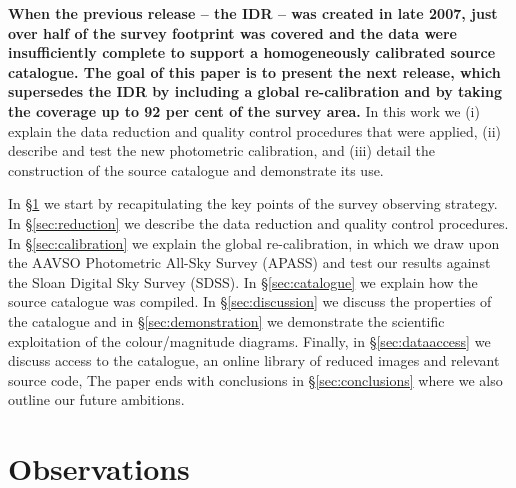 \documentclass[a4paper,useAMS,usenatbib]{mn2e}
\begin{document}
{\bf When the previous release -- the IDR -- was created in late 2007,
just over half of the survey footprint was covered
and the data were insufficiently complete 
to support a homogeneously calibrated source catalogue.
The goal of this paper is to present the next release, 
 which supersedes the IDR by including a global re-calibration
and by taking the coverage up to 92 per cent of the survey area.}
In this work we
(i) explain the data reduction 
and quality control procedures that were applied,
(ii) describe and test the new photometric calibration, and 
(iii) detail the construction of the source catalogue
and demonstrate its use.

In \S\ref{sec:observations} we start by recapitulating the key points
of the survey observing strategy.
In \S\ref{sec:reduction} we describe the data reduction
and quality control procedures.
In \S\ref{sec:calibration} we explain the global re-calibration, in which
we draw upon the AAVSO Photometric All-Sky Survey (APASS)
and test our results against the Sloan Digital Sky Survey (SDSS).
In \S\ref{sec:catalogue} we explain how the source catalogue was compiled.
In \S\ref{sec:discussion} we discuss the properties of the catalogue
and in \S\ref{sec:demonstration} we demonstrate
the scientific exploitation of the colour/magnitude diagrams.
Finally, in \S\ref{sec:dataaccess} we discuss access
to the catalogue, an online library of reduced images and relevant source code,
The paper ends with conclusions in \S\ref{sec:conclusions} where we also outline
our future ambitions.

\section{Observations}
\label{sec:observations}
\end{document}
